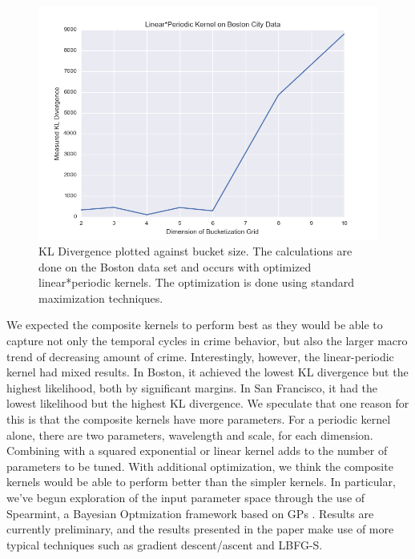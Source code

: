 \documentclass[letterpaper, 11 pt, conference]{ieeeconf}  %
\begin{document}
\begin{figure}
\centering
\includegraphics[scale=0.4]{kl_periodic_linear_periodic}
\caption{KL Divergence plotted against bucket size. The calculations are done on the Boston data set and occurs with optimized linear*periodic kernels. The optimization is done using standard maximization techniques.}
\label{fig:kl_divergence}
\end{figure}

We expected the composite kernels to perform best as they would be able to capture not only the temporal cycles in crime behavior, but also the larger macro trend of decreasing amount of crime. Interestingly, however, the linear-periodic kernel had mixed results. In Boston, it achieved the lowest KL divergence but the highest likelihood, both by significant margins. In San Francisco, it had the lowest likelihood but the highest KL divergence. We speculate that one reason for this is that the composite kernels have more parameters. For a periodic kernel alone, there are two parameters, wavelength and scale, for each dimension. Combining with a squared exponential or linear kernel adds to the number of parameters to be tuned. With additional optimization, we think the composite kernels would be able to perform better than the simpler kernels. In particular, we've begun exploration of the input parameter space through the use of Spearmint, a Bayesian Optmization framework based on GPs \cite{bayes_opt}. Results are currently preliminary, and the results presented in the paper make use of more typical techniques such as gradient descent/ascent and LBFG-S.
\end{document}
